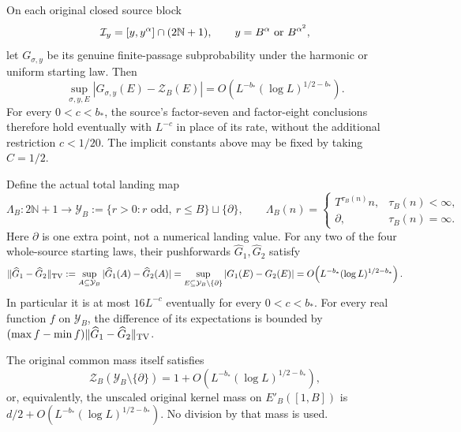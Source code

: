 \begin{corollary}
\label{cor:Mazur-genuine-source}
On each original closed source block
\[
 \mathcal I_y=[y,y^\alpha]\cap(2\mathbb N+1),
 \qquad y=B^\alpha\ \hbox{or}\ B^{\alpha^2},
\]
let $G_{\sigma,y}$ be its genuine finite-passage subprobability under
the harmonic or uniform starting law. Then
\[
 \sup_{\sigma,y,E}|G_{\sigma,y}(E)-\mathcal Z_B(E)|
 =O\!\left(L^{-b_*}(\log L)^{1/2-b_*}\right).
\]
For every $0<c<b_*$, the source's factor-seven and factor-eight
conclusions therefore hold eventually with $L^{-c}$ in place of
its rate, without the additional restriction $c<1/20$.
The implicit constants above may be fixed by taking $C=1/2$.

Define the actual total landing map
\[
 \Lambda_B:2\mathbb N+1\longrightarrow
 \mathcal Y_B:=\{r>0:r\text{ odd},\ r\le B\}\sqcup\{\partial\},
 \qquad
 \Lambda_B(n)=
 \begin{cases}T^{\tau_B(n)}n,&\tau_B(n)<\infty,\\
 \partial,&\tau_B(n)=\infty .
 \end{cases}
\]
Here $\partial$ is one extra point, not a numerical landing value.
For any two of the four whole-source starting laws, their pushforwards
$\widehat G_1,\widehat G_2$ satisfy
\begin{equation}
 \|\widehat G_1-\widehat G_2\|_{\rm TV}
 :=\sup_{A\subseteq\mathcal Y_B}|\widehat G_1(A)-\widehat G_2(A)|
 =\sup_{E\subseteq\mathcal Y_B\setminus\{\partial\}}
                      |G_1(E)-G_2(E)|
 =O\!\left(L^{-b_*}(\log L)^{1/2-b_*}\right).
 \label{eq:Mazur-completed-tv}
\end{equation}
In particular it is at most $16L^{-c}$ eventually for every $0<c<b_*$.
For every real function $f$ on $\mathcal Y_B$, the difference of its
expectations is bounded by
$(\max f-\min f)\|\widehat G_1-\widehat G_2\|_{\rm TV}$.

The original common mass itself satisfies
\[
 \mathcal Z_B(\mathcal Y_B\setminus\{\partial\})
 =1+O\!\left(L^{-b_*}(\log L)^{1/2-b_*}\right),
\]
or, equivalently, the unscaled original kernel mass on $E'_B([1,B])$
is $d/2+O(L^{-b_*}(\log L)^{1/2-b_*})$. No division by that mass is used.
\end{corollary}
